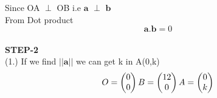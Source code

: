 \documentclass[10pt,a4paper]{report}
\begin{document}
\begin{multicols}{2}
Since OA $\perp$ OB  i.e $\boldsymbol{a}$ $\perp$  $\boldsymbol{b}$ \\\vspace{3mm}
From Dot product \\
\begin{equation}
\boldsymbol{a}.\boldsymbol{b} = 0 
\end{equation}\vspace{2mm}\\

\textbf{STEP-2}\vspace{2mm}\\
(1.) If we find $\boldsymbol{||a||}$  we can get k in A(0,k) \\\vspace{2mm}
\begin{equation}
    O=\begin{pmatrix}
0\\
0
\end{pmatrix} 
    B=\begin{pmatrix}
12\\
0
\end{pmatrix} 
    A=\begin{pmatrix}
0\\
k
 \end{pmatrix}  \vspace{3mm}
\end{equation}
  

\end{multicols}
\end{document}
